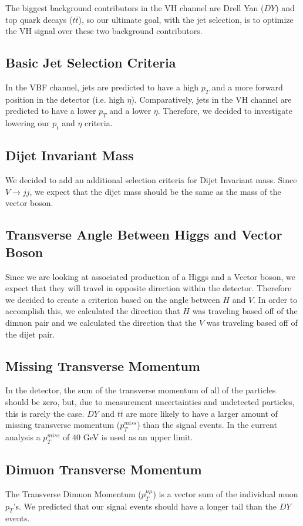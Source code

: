 \documentclass[12pt]{article}
\begin{document}
The biggest background contributors in the VH channel are Drell Yan ($DY$) and top quark decays ($t\overline{t}$), so our ultimate goal, with the jet selection, is to optimize the VH signal over these two background contributors.
\subsection{Basic Jet Selection Criteria}
In the VBF channel, jets are predicted to have a high $p_{T}$ and a more forward position in the detector (i.e. high $\eta$). Comparatively, jets in the VH channel are predicted to have a lower $p_{T}$ and a lower $\eta$. Therefore, we decided to investigate lowering our $p_{t}$ and $\eta$ criteria.
\subsection{Dijet Invariant Mass}
We decided to add an additional selection criteria for Dijet Invariant mass. Since $V \rightarrow jj$, we expect that the dijet mass should be the same as the mass of the vector boson.
\subsection{Transverse Angle Between Higgs and Vector Boson}
Since we are looking at associated production of a Higgs and a Vector boson, we expect that they will travel in opposite direction within the detector. Therefore we decided to create a criterion based on the angle between $H$ and $V$. In order to accomplish this, we calculated the direction that $H$ was traveling based off of the dimuon pair and we calculated the direction that the $V$ was traveling based off of the dijet pair. 
\subsection{Missing Transverse Momentum}
In the detector, the sum of the transverse momentum of all of the particles should be zero, but, due to measurement uncertainties and undetected particles, this is rarely the case. $DY$ and $t\overline{t}$ are more likely to have a larger amount of missing transverse momentum ($p_{T}^{miss}$) than the signal events. In the current analysis a $p_{T}^{miss}$ of 40 GeV is used as an upper limit.
\subsection{Dimuon Transverse Momentum}
The Transverse Dimuon Momentum ($p_{T}^{\mu \mu}$) is a vector sum of the individual muon $p_{T}$'s. We predicted that our signal events should have a longer tail than the $DY$ events.
\end{document}
